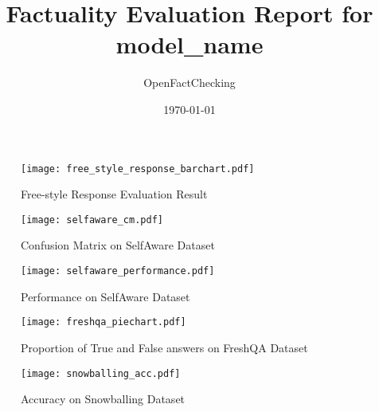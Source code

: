 \documentclass{article}
\title{Factuality Evaluation Report for {{model_name}}}
\author{OpenFactChecking}
\date{\today}
\begin{document}
\maketitle



\begin{figure}[H]
    \centering
    \texttt{[image: free\_style\_response\_barchart.pdf]}
    \caption{Free-style Response Evaluation Result}
\end{figure}

\begin{figure}[H]
    \centering
    \texttt{[image: selfaware\_cm.pdf]}
    \caption{Confusion Matrix on SelfAware Dataset}
\end{figure}

\begin{figure}[H]
    \centering
    \texttt{[image: selfaware\_performance.pdf]}
    \caption{Performance on SelfAware Dataset}
\end{figure}


\begin{figure}[H]
    \centering
    \texttt{[image: freshqa\_piechart.pdf]}
    \caption{Proportion of True and False answers on FreshQA Dataset}
\end{figure}


\begin{figure}[H]
    \centering
    \texttt{[image: snowballing\_acc.pdf]}
    \caption{Accuracy on Snowballing Dataset}
\end{figure}
\end{document}
